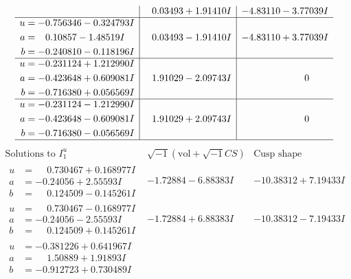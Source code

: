 \documentclass[1p]{elsarticle_modified}
\theoremstyle{definition}
\newcommand{\I}{\sqrt{-1}}
\begin{document}
$$\begin{array}{c|c|c}
 & \phantom{-}0.03493 + 1.91410 I & -4.83110 - 3.77039 I \\ \hline\begin{aligned}
u &= -0.756346 - 0.324793 I \\
a &= \phantom{-}0.10857 - 1.48519 I \\
b &= -0.240810 - 0.118196 I\end{aligned}
 & \phantom{-}0.03493 - 1.91410 I & -4.83110 + 3.77039 I \\ \hline\begin{aligned}
u &= -0.231124 + 1.212990 I \\
a &= -0.423648 + 0.609081 I \\
b &= -0.716380 + 0.056569 I\end{aligned}
 & \phantom{-}1.91029 - 2.09743 I & \phantom{-0.000000 } 0 \\ \hline\begin{aligned}
u &= -0.231124 - 1.212990 I \\
a &= -0.423648 - 0.609081 I \\
b &= -0.716380 - 0.056569 I\end{aligned}
 & \phantom{-}1.91029 + 2.09743 I & \phantom{-0.000000 } 0\\
 \hline 
 \end{array}$$\newpage$$\begin{array}{c|c|c}  
\text{Solutions to }I^u_{1}& \I (\text{vol} + \sqrt{-1}CS) & \text{Cusp shape}\\
 \hline 
\begin{aligned}
u &= \phantom{-}0.730467 + 0.168977 I \\
a &= -0.24056 + 2.55593 I \\
b &= \phantom{-}0.124509 - 0.145261 I\end{aligned}
 & -1.72884 - 6.88383 I & -10.38312 + 7.19433 I \\ \hline\begin{aligned}
u &= \phantom{-}0.730467 - 0.168977 I \\
a &= -0.24056 - 2.55593 I \\
b &= \phantom{-}0.124509 + 0.145261 I\end{aligned}
 & -1.72884 + 6.88383 I & -10.38312 - 7.19433 I \\ \hline\begin{aligned}
u &= -0.381226 + 0.641967 I \\
a &= \phantom{-}1.50889 + 1.91893 I \\
b &= -0.912723 + 0.730489 I\end{aligned}

\end{array}$$
\end{document}
